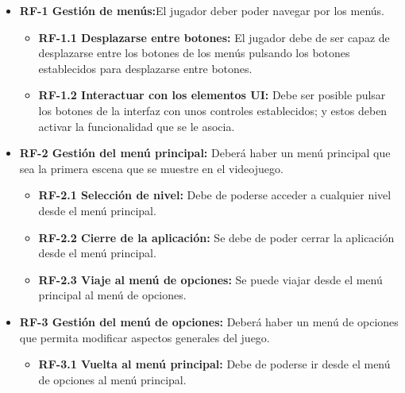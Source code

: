 \begin{itemize}
\item
\textbf{RF-1 Gestión de menús:}El jugador deber poder navegar por los menús.

\begin{itemize}
\item
\textbf{RF-1.1 Desplazarse entre botones:} El jugador debe de ser capaz de desplazarse entre los botones de los menús pulsando los botones establecidos para desplazarse entre botones.
\end{itemize}

\begin{itemize}
\item
\textbf{RF-1.2 Interactuar con los elementos UI:} Debe ser posible pulsar los botones de la interfaz con unos controles establecidos; y estos deben activar la funcionalidad que se le asocia.
\end{itemize}

\item
\textbf{RF-2 Gestión del menú principal:} Deberá haber un menú principal que sea la primera escena que se muestre en el videojuego.

\begin{itemize}
\item
\textbf{RF-2.1 Selección de nivel:} Debe de poderse acceder a cualquier nivel desde el menú principal.
\end{itemize}

\begin{itemize}
\item
\textbf{RF-2.2 Cierre de la aplicación:} Se debe de poder cerrar la aplicación desde el menú principal.
\end{itemize}

\begin{itemize}
\item
\textbf{RF-2.3 Viaje al menú de opciones:} Se puede viajar desde el menú principal al menú de opciones.
\end{itemize}

\item
\textbf{RF-3 Gestión del menú de opciones:} Deberá haber un menú de opciones que permita modificar aspectos generales del juego.

\begin{itemize}
\item
\textbf{RF-3.1 Vuelta al menú principal:} Debe de poderse ir desde el menú de opciones al menú principal.
\end{itemize}


\end{itemize}
